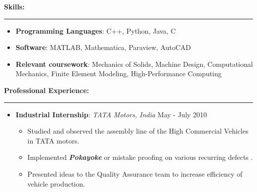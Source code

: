 \documentclass[10pt,fleqn]{article}
\begin{document}
\vspace{-5pt}
\textbf{Skills:}
\vspace{-25pt}
\begin{center}
\rule{\textwidth}{.4pt}
\end{center}
\vspace{-15pt}
\begin{itemize}
\setlength{\itemsep}{0pt}
\setlength{\parskip}{0pt}
\setlength{\itemindent}{-5mm}
\item[] \textbf{Programming Languages}: C++, Python, Java, C
\item[] \textbf{Software}: MATLAB, Mathematica, Paraview, AutoCAD
\item[] \textbf{Relevant coursework}: Mechanics of Solids, Machine Design, Computational Mechanics, Finite Element Modeling, High-Performance Computing
\end{itemize}
\vspace{-5pt}
\textbf{Professional Experience:}
\vspace{-25pt}
\begin{center}
\rule{\textwidth}{.4pt}
\end{center}
\vspace{-15pt}
\begin{itemize}
\setlength{\itemsep}{8pt}
\setlength{\parskip}{0pt}
\setlength{\itemindent}{-5mm}
\item[] \textbf{Industrial Internship}: \emph{TATA Motors, India} \hfill May - July 2010
		    \begin{itemize}
		    \item Studied and observed the assembly line of the High Commercial Vehicles in TATA motors.
			\item Implemented \textbf{\emph{Pokayoke}} or mistake proofing on various recurring defects .
			\item Presented ideas to the Quality Assurance team to increase efficiency of vehicle production.
 			\end{itemize} 			
\end{itemize}
\end{document}
